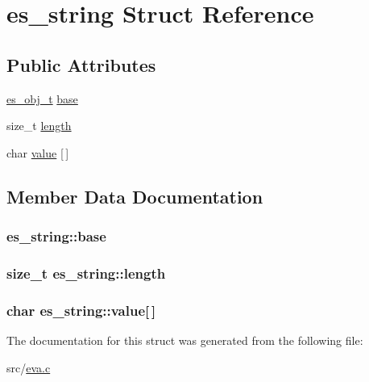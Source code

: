 \hypertarget{structes__string}{\section{es\-\_\-string Struct Reference}
\label{structes__string}
}
\subsection*{Public Attributes}
\begin{DoxyCompactItemize}
\item 
\hyperlink{eva_8h_a3370a89a85f5ff467ca5e7dba47e63bc}{es\-\_\-obj\-\_\-t} \hyperlink{structes__string_aa61ec48f6c571bff885637dc467c18ea}{base}
\item 
size\-\_\-t \hyperlink{structes__string_a634454ab6b2baf664187a86b93063fcb}{length}
\item 
char \hyperlink{structes__string_abd7e2d58443e16246616f5e7695f4652}{value} \mbox{[}$\,$\mbox{]}
\end{DoxyCompactItemize}


\subsection{Member Data Documentation}
\hypertarget{structes__string_aa61ec48f6c571bff885637dc467c18ea}{
\subsubsection[{base}]{ es\-\_\-string\-::base}}\label{structes__string_aa61ec48f6c571bff885637dc467c18ea}
\hypertarget{structes__string_a634454ab6b2baf664187a86b93063fcb}{
\subsubsection[{length}]{\setlength{\rightskip}{0pt plus 5cm}size\-\_\-t es\-\_\-string\-::length}}\label{structes__string_a634454ab6b2baf664187a86b93063fcb}
\hypertarget{structes__string_abd7e2d58443e16246616f5e7695f4652}{
\subsubsection[{value}]{\setlength{\rightskip}{0pt plus 5cm}char es\-\_\-string\-::value\mbox{[}$\,$\mbox{]}}}\label{structes__string_abd7e2d58443e16246616f5e7695f4652}


The documentation for this struct was generated from the following file\-:\begin{DoxyCompactItemize}
\item 
src/\hyperlink{eva_8c}{eva.\-c}\end{DoxyCompactItemize}
